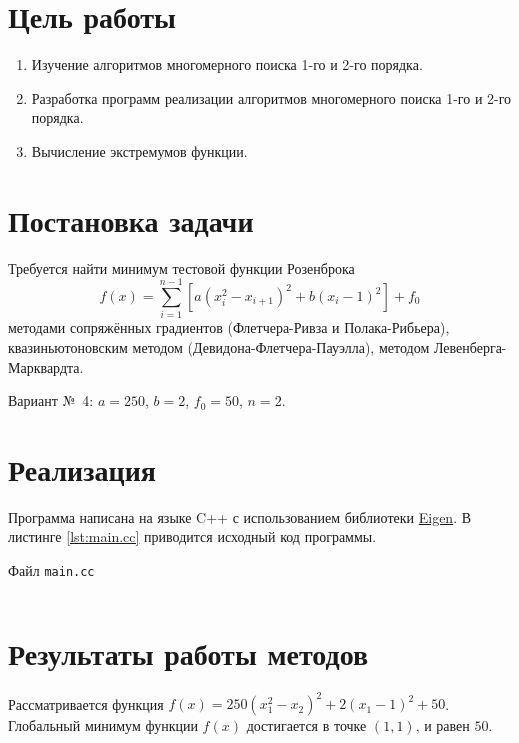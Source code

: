 \documentclass[a4paper, 14pt]{extarticle}
\newenvironment{longlisting}{\captionsetup{type=listing}}{}
\begin{document}
\renewcommand{\ttdefault}{pcr}

\setlength{\tabcolsep}{3pt}
\newpage
\setcounter{page}{2}

\section{Цель работы}

\begin{enumerate}
  \item Изучение алгоритмов многомерного поиска 1-го и 2-го порядка.
  \item Разработка программ реализации алгоритмов многомерного поиска 1-го и 2-го порядка.
  \item Вычисление экстремумов функции.
\end{enumerate}

\section{Постановка задачи}

Требуется найти минимум тестовой функции Розенброка 
\begin{displaymath}
  f(x) = \sum_{i=1}^{n-1}[a (x_i^2 - x_{i+1})^2 + b (x_i - 1)^2] + f_0
\end{displaymath}
методами сопряжённых градиентов (Флетчера-Ривза и Полака-Рибьера), квазиньютоновским методом (Девидона-Флетчера-Пауэлла),
методом Левенберга-Марквардта.

Вариант №~4: $a = 250$, $b = 2$, $f_0 = 50$, $n = 2$.

\section{Реализация}

Программа написана на языке C++ с использованием библиотеки \href{https://eigen.tuxfamily.org/index.php?title=Main_Page}{Eigen}.
В листинге \ref{lst:main.cc} приводится исходный код программы.
 
\begin{longlisting}
  \caption{Файл \texttt{main.cc}}
  \inputminted{cpp}{../src/main.cc}
  \label{lst:main.cc}
\end{longlisting}

\section{Результаты работы методов}

Рассматривается функция $f(x) = 250 (x_1^2 - x_2)^2 + 2 (x_1 - 1)^2 + 50$. Глобальный минимум функции $f(x)$ достигается в точке
$(1, 1)$, и равен $50$. 
\end{document}
